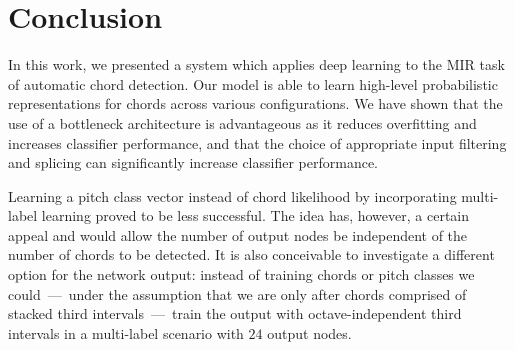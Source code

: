 \documentclass{article}
\begin{document}
\section{Conclusion}
In this work, we presented a system which applies deep learning to the MIR task of automatic chord detection. Our model is able to learn high-level probabilistic representations for chords across various configurations. We have shown that 
the use of a bottleneck architecture is advantageous as it reduces overfitting and increases classifier performance, and that
the choice of appropriate input filtering and splicing can significantly increase classifier performance.

Learning a pitch class vector instead of chord likelihood by incorporating multi-label learning proved to be less successful. The idea has, however, a certain appeal and would allow the number of output nodes be independent of the number of chords to be detected. It is also conceivable to investigate a different option for the network output: instead of training chords or pitch classes we could~---~under the assumption that we are only after chords comprised of stacked third intervals~---~train the output with octave-independent third intervals in a multi-label scenario with $24$ output nodes.


\end{document}
